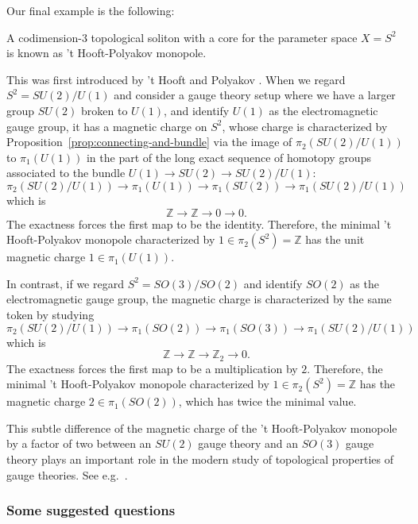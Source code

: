\documentclass[12pt]{article}
\numberwithin{equation}{section}
\theoremstyle{remark}
\def\bZ{\mathbb{Z}}
\begin{document}
Our final example is the following:
\begin{example}
A codimension-3 topological soliton with a core for the parameter space $X=S^2$
is known as 't Hooft-Polyakov monopole.
\end{example}
This was first introduced by 't Hooft \cite{tHooft:1974kcl} and Polyakov \cite{Polyakov:1974ek}.
When we regard $S^2=SU(2)/U(1)$
and consider a gauge theory setup where we have a larger group $SU(2)$ broken to $U(1)$,
and identify $U(1)$ as the electromagnetic gauge group,
it has a magnetic charge on $S^2$,
whose charge is characterized by Proposition~\ref{prop:connecting-and-bundle} 
via the image of $\pi_2(SU(2)/U(1))$ to $\pi_1(U(1))$ in the part of
 the long exact sequence of  homotopy groups associated to the bundle $U(1)\to SU(2)\to SU(2)/U(1)$: \begin{equation}
 \pi_2(SU(2)/U(1)) \to \pi_1(U(1)) \to \pi_1(SU(2))\to \pi_1(SU(2)/U(1))
\end{equation} which is \begin{equation}
 \bZ \to \bZ \to 0 \to 0.
\end{equation}
The exactness forces the first map to be the identity.
Therefore, the minimal 't Hooft-Polyakov monopole characterized by $1\in \pi_2(S^2)=\bZ$
has the unit magnetic charge $1\in \pi_1(U(1))$.

In contrast, if we regard $S^2=SO(3)/SO(2)$
and identify $SO(2)$ as the electromagnetic gauge group,
the magnetic charge is characterized by the same token by studying \begin{equation}
 \pi_2(SU(2)/U(1)) \to \pi_1(SO(2)) \to \pi_1(SO(3)) \to \pi_1(SU(2)/U(1))
\end{equation} which is \begin{equation}
 \bZ \to \bZ \to \bZ_2 \to 0.
\end{equation}
The exactness forces the first map to be a multiplication by $2$.
Therefore, the minimal 't Hooft-Polyakov monopole characterized by $1\in \pi_2(S^2)=\bZ$
has the magnetic charge $2\in \pi_1(SO(2))$, which has twice the minimal value.

This subtle difference of the magnetic charge of the 't Hooft-Polyakov monopole by a factor of two
between an $SU(2)$ gauge theory and an $SO(3)$ gauge theory
 plays an important role in the modern study of topological properties of gauge theories.
 See e.g.~\cite{Aharony:2013hda}.

\subsubsection{Some suggested questions}
\end{document}
